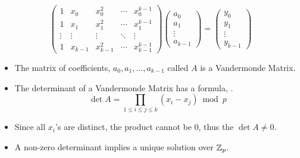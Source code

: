 \begin{enumerate}[noitemsep]
\begin{enumerate}[noitemsep]
\begin{equation*}
      \begin{pmatrix}
        1 & x_{0} & x_{0}^{2} & \cdots & x_{0}^{k-1} \\
        1 & x_{1} & x_{1}^{2} & \cdots & x_{1}^{k-1} \\
        \vdots & \vdots & \vdots & \ddots & \vdots \\
        1 & x_{k-1} & x_{k-1}^{2} & \cdots & x_{k-1}^{k-1}
      \end{pmatrix}
      \begin{pmatrix}
        a_{0} \\
        a_{1} \\
        \vdots \\
        a_{k-1}
      \end{pmatrix} =
      \begin{pmatrix}
        y_{0} \\
        y_{1} \\
        \vdots \\
        y_{k-1}
      \end{pmatrix}
    \end{equation*}
    \begin{itemize}[noitemsep]
    \item The matrix of coefficients, $a_{0}, a_{1}, \ldots, a_{k-1}$ called $A$ is a Vandermonde Matrix.
    \item The determinant of a Vandermonde Matrix has a formula, .
      \begin{equation}\label{eq:Vandermonde_Matrix_Determinant}
        \det A = \prod\limits_{1 \leq i \leq j \leq k} (x_{i} - x_{j}) \bmod p
      \end{equation}
    \item Since all $x_{i}$'s are distinct, the product cannot be 0, thus the $\det A \neq 0$.
    \item A non-zero determinant implies a unique solution over $\operatorname{\mathbb{Z}}_{p}$.
    \end{itemize}
  \end{enumerate}
\end{enumerate}

